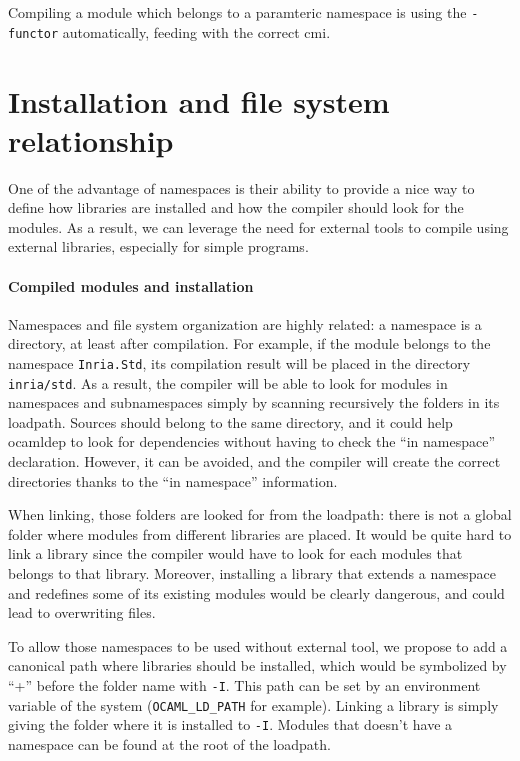 \documentclass[11pt,a4paper]{article}
\begin{document}
Compiling a module which belongs to a paramteric namespace is using the
\lstinline{-functor} automatically, feeding with the correct cmi. 

\section{Installation and file system relationship}

One of the advantage of namespaces is their ability to provide a nice way to
define how libraries are installed and how the compiler should look for the
modules. As a result, we can leverage the need for external tools to compile
using external libraries, especially for simple programs.

\paragraph{Compiled modules and installation}

Namespaces and file system organization are highly related: a namespace is a
directory, at least after compilation. For example, if the module belongs to the
namespace \texttt{Inria.Std}, its compilation result will be placed in the
directory \texttt{inria/std}. As a result, the compiler will be able to look for
modules in namespaces and subnamespaces simply by scanning recursively the
folders in its loadpath. Sources should belong to the same directory, and it
could help ocamldep to look for dependencies without having to check the ``in
namespace'' declaration. However, it can be avoided, and the compiler will
create the correct directories thanks to the ``in namespace'' information.

When linking, those folders are looked for from the loadpath: there is not a
global folder where modules from different libraries are placed. It would be
quite hard to link a library since the compiler would have to look for each
modules that belongs to that library. Moreover, installing a library that
extends a namespace and redefines some of its existing modules would be clearly
dangerous, and could lead to overwriting files.

To allow those namespaces to be used without external tool, we propose to add a
canonical path where libraries should be installed, which would be symbolized by
``+'' before the folder name with \texttt{-I}. This path can be set by an
environment variable of the system (\texttt{OCAML\_LD\_PATH} for
example). Linking a library is simply giving the folder where it is installed to
\texttt{-I}. Modules that doesn't have a namespace can be found at the root of
the loadpath.
\end{document}
